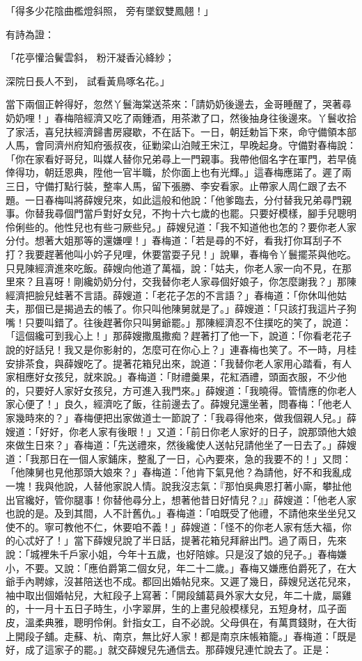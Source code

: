 「得多少花陰曲檻燈斜照，  旁有墜釵雙鳳翹！」

有詩為證：

「花亭懽洽鬢雲斜，  粉汗凝香沁絳紗；

深院日長人不到，  試看黃鳥啄名花。」

當下兩個正幹得好，忽然丫鬟海棠送茶來：「請奶奶後邊去，金哥睡醒了，哭著尋奶奶哩！」春梅陪經濟又吃了兩鍾酒，用茶漱了口，然後抽身往後邊來。丫鬟收拾了家活，喜兒扶經濟歸書房寢歇，不在話下。一日，朝廷勅旨下來，命守備領本部人馬，會同濟州府知府張叔夜，征勦梁山泊賊王宋江，早晚起身。守備對春梅說：「你在家看好哥兒，叫媒人替你兄弟尋上一門親事。我帶他個名字在軍門，若早僥倖得功，朝廷恩典，陞他一官半職，於你面上也有光輝。」這春梅應諾了。遲了兩三日，守備打點行裝，整率人馬，留下張勝、李安看家。止帶家人周仁跟了去不題。一日春梅叫將薛嫂兒來，如此這般和他說：「他爹臨去，分付替我兄弟尋門親事。你替我尋個門當戶對好女兒，不拘十六七歲的也罷。只要好模樣，腳手兒聰明伶俐些的。他性兒也有些刁厥些兒。」薛嫂兒道：「我不知道他也怎的？要你老人家分付。想著大姐那等的還嫌哩！」春梅道：「若是尋的不好，看我打你耳刮子不打？我要趕著他叫小妗子兒哩，休要當耍子兒！」說畢，春梅令丫鬟擺茶與他吃。只見陳經濟進來吃飯。薛嫂向他道了萬福，說：「姑夫，你老人家一向不見，在那里來？且喜呀！剛纔奶奶分付，交我替你老人家尋個好娘子，你怎麼謝我？」那陳經濟把臉兒蛙著不言語。薛嫂道：「老花子怎的不言語？」春梅道：「你休叫他姑夫，那個已是揭過去的帳了。你只叫他陳舅就是了。」薛嫂道：「只該打我這片子狗嘴！只要叫錯了。往後趕著你只叫舅爺罷。」那陳經濟忍不住撲吃的笑了，說道：「這個纔可到我心上！」那薛嫂撒風撒痴？趕著打了他一下，說道：「你看老花子說的好話兒！我又是你影射的，怎麼可在你心上？」連春梅也笑了。不一時，月桂安排茶食，與薛嫂吃了。提著花箱兒出來，說道：「我替你老人家用心踏看，有人家相應好女孩兒，就來說。」春梅道：「財禮羹果，花紅酒禮，頭面衣服，不少他的，只要好人家好女孩兒，方可進入我門來。」薛嫂道：「我曉得。管情應的你老人家心便了！」良久，經濟吃了飯，往前邊去了。薛嫂兒還坐著，問春梅：「他老人家幾時來的？」春梅便把出家做道士一節說了：「我尋得他來，做我個親人兒。」薛嫂道：「好好，你老人家有後眼！」又道：「前日你老人家好的日子，說那頭他大娘來做生日來？」春梅道：「先送禮來，然後纔使人送帖兒請他坐了一日去了。」薛嫂道：「我那日在一個人家鋪床，整亂了一日，心內要來，急的我要不的！」又問：「他陳舅也見他那頭大娘來？」春梅道：「他肯下氣見他？為請他，好不和我亂成一塊！我與他說，人替他家說人情。說我沒志氣：『那怕吳典恩打著小廝，攀扯他出官纔好，管你腿事！你替他尋分上，想著他昔日好情兒？』」薛嫂道：「他老人家也說的是。及到其間，人不計舊仇。」春梅道：「咱既受了他禮，不請他來坐坐兒又使不的。寧可教他不仁，休要咱不義！」薛嫂道：「怪不的你老人家有恁大福，你的心忒好了！」當下薛嫂兒說了半日話，提著花箱兒拜辭出門。過了兩日，先來說：「城裡朱千戶家小姐，今年十五歲，也好陪嫁。只是沒了娘的兒子。」春梅嫌小，不要。又說：「應伯爵第二個女兒，年二十二歲。」春梅又嫌應伯爵死了，在大爺手內聘嫁，沒甚陪送也不成。都回出婚帖兒來。又遲了幾日，薛嫂兒送花兒來，袖中取出個婚帖兒，大紅段子上寫著：「開段舖葛員外家大女兒，年二十歲，屬雞的，十一月十五日子時生，小字翠屏，生的上畫兒般模樣兒，五短身材，瓜子面皮，溫柔典雅，聰明伶俐。針指女工，自不必說。父母俱在，有萬貫錢財，在大街上開段子舖。走蘇、杭、南京，無比好人家！都是南京床帳箱籠。」春梅道：「既是好，成了這家子的罷。」就交薛嫂兒先通信去。那薛嫂兒連忙說去了。正是：

